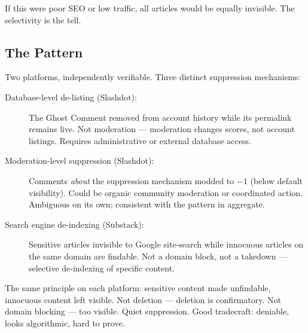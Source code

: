 %

If this were poor SEO or low traffic, all articles would be equally invisible. The selectivity is the tell.

\subsection*{The Pattern}
\label{pos34:the-pattern}

Two platforms, independently verifiable. Three distinct suppression mechanisms:

\begin{description}
\item[Database-level de-listing (Slashdot):] The Ghost Comment removed from account history while its permalink remains live. Not moderation --- moderation changes scores, not account listings. Requires administrative or external database access.
\item[Moderation-level suppression (Slashdot):] Comments \textit{about} the suppression mechanism modded to $-1$ (below default visibility). Could be organic community moderation or coordinated action. Ambiguous on its own; consistent with the pattern in aggregate.
\item[Search engine de-indexing (Substack):] Sensitive articles invisible to Google site-search while innocuous articles on the same domain are findable. Not a domain block, not a takedown --- selective de-indexing of specific content.
\end{description}

The same principle on each platform: sensitive content made unfindable, innocuous content left visible. Not deletion --- deletion is confirmatory. Not domain blocking --- too visible. Quiet suppression. Good tradecraft: deniable, looks algorithmic, hard to prove.

